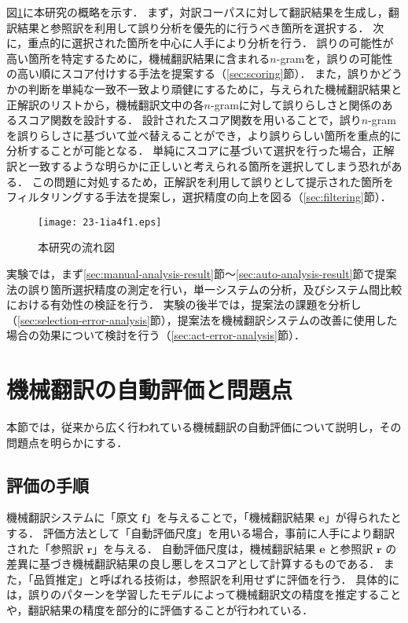 \documentclass[japanese]{jnlp_1.4}
\newcommand{\textcolor}[2]{}
\begin{document}
\textcolor{black}{本研究では，前述の問題点を克服し，機械翻訳システムの誤りと判断されたものの内，より誤りの可能性が高い箇所を優先的に捉える手法を提案する．}
図\ref{fig:scoring-ex}に本研究の概略を示す．
まず，対訳コーパスに対して翻訳結果を生成し，翻訳結果と参照訳を利用して誤り分析を優先的に行うべき箇所を選択する．
次に，重点的に選択された箇所を中心に人手により分析を行う．
誤りの可能性が高い箇所を特定するために，機械翻訳結果に含まれる$n$-gramを，誤りの可能性の高い順にスコア付けする手法を提案する（\ref{sec:scoring}節）．
また，誤りかどうかの判断を単純な一致不一致より頑健にするために，与えられた機械翻訳結果と正解訳のリストから，機械翻訳文中の各$n$-gramに対して誤りらしさと関係のあるスコア関数を設計する．
設計されたスコア関数を用いることで，誤り$n$-gramを誤りらしさに基づいて並べ替えることができ，より誤りらしい箇所を重点的に分析することが可能となる．
単純にスコアに基づいて選択を行った場合，正解訳と一致するような明らかに正しいと考えられる箇所を選択してしまう恐れがある．
この問題に対処するため，正解訳を利用して誤りとして提示された箇所をフィルタリングする手法を提案し，選択精度の向上を図る（\ref{sec:filtering}節）．

\begin{figure}[t]
\begin{center}
\texttt{[image: 23-1ia4f1.eps]}
\end{center}
\caption{本研究の流れ図}
\label{fig:scoring-ex}
\vspace{-0.5\Cvs}
\end{figure}

実験では，まず\ref{sec:manual-analysis-result}節〜\ref{sec:auto-analysis-result}節で提案法の誤り箇所選択精度の測定を行い，単一システムの分析，及びシステム間比較における有効性の検証を行う．
実験の後半では，提案法の課題を分析し（\ref{sec:selection-error-analysis}節），提案法を機械翻訳システムの改善に使用した場合の効果について検討を行う（\ref{sec:act-error-analysis}節）．


\section{機械翻訳の自動評価と問題点}
\label{sec:analysis}

本節では，従来から広く行われている機械翻訳の自動評価について説明し，その問題点を明らかにする．


\subsection{評価の手順}

機械翻訳システムに「原文 $\boldsymbol{f}$」を与えることで，「機械翻訳結果 $\boldsymbol{e}$」が得られたとする．
評価方法として「自動評価尺度」を用いる場合，事前に人手により翻訳された「参照訳 $\boldsymbol{r}$」を与える．
自動評価尺度は，機械翻訳結果 $\boldsymbol{e}$ と参照訳 $\boldsymbol{r}$ の差異に基づき機械翻訳結果の良し悪しをスコアとして計算するものである\cite{papineni02bleu,doddington02nistmetric,banerjee05meteor}．
また，「品質推定」と呼ばれる技術は，参照訳を利用せずに評価を行う．
具体的には，誤りのパターンを学習したモデルによって機械翻訳文の精度を推定することや\cite{specia09qualityestimation}，翻訳結果の精度を部分的に評価することが行われている\cite{bach11goodness}．
\end{document}
